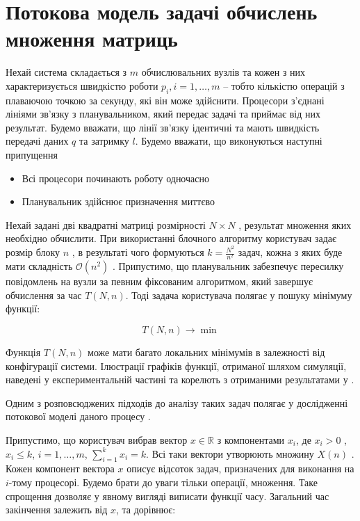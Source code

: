 \section{Потокова модель задачі обчислень множення матриць}

Нехай система складається з $m$ обчислювальних вузлів та кожен з них характеризується швидкістю роботи $p_i , i=1,\ldots,m$ – тобто кількістю операцій з плаваючою точкою за секунду, які він може здійснити. Процесори з’єднані лініями зв’язку з планувальником, який передає задачі та приймає від них результат. Будемо вважати, що лінії зв’язку ідентичні та мають швидкість передачі даних $q$ та затримку $l$.
Будемо вважати, що виконуються наступні припущення
\begin{itemize}
	\item Всі процесори починають роботу одночасно
	\item Планувальник здійснює призначення миттєво
\end{itemize}

Нехай задані дві квадратні матриці розмірності $N \times N$ , результат множення яких необхідно обчислити. При використанні блочного алгоритму користувач задає розмір блоку $n$ , в результаті чого формуються $k=\frac{N^2}{n^2}$  задач, кожна з яких буде мати складність $\mathcal{O}(n^2)$ . Припустимо, що планувальник забезпечує пересилку повідомлень на вузли за певним фіксованим алгоритмом, який завершує обчислення за час $T(N,n)$. Тоді задача користувача полягає у пошуку мінімуму функції:

\begin{equation}
	\label{eq:general_minimization_problem}
	T(N,n) \longrightarrow \min
\end{equation}

Функція $T(N,n)$ може мати багато локальних мінімумів в залежності від конфігурації системи. Ілюстрації графіків функції, отриманої шляхом симуляції, наведені у експериментальній частині та корелють з отриманими результатами у \cite{DoroshenkoIgnatenkoIvanenko}.

Одним з розповсюджених підходів до аналізу таких задач полягає у дослідженні потокової моделі даного процесу \cite{FluidModelForJobScheduling}.

Припустимо, що користувач вибрав вектор $x \in \mathbb{R}$ з компонентами $x_i$, де $x_i > 0$ , $x_i \le k$, $i=1,\ldots,m$, $\sum_{i=1}^{k}x_i = k$. Всі таки вектори утворюють множину $X(n)$ . Кожен компонент вектора $x$ описує відсоток задач, призначених для виконання на  $i$-тому процесорі. Будемо брати до уваги тільки операції, множення. Таке спрощення дозволяє у явному вигляді виписати функції часу. Загальний час закінчення залежить від  $x$, та дорівнює:

